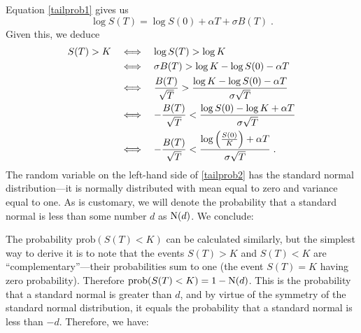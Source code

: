 Equation \eqref{tailprob1} gives us
$$\log S(T) = \log S(0) + \alpha T + \sigma B(T)\; .$$
Given this, we deduce
\begin{align} 
S(T) > K & \quad\Longleftrightarrow\quad \log S(T) > \log K\notag\\
& \quad\Longleftrightarrow\quad \sigma B(T) > \log K - \log S(0)-\alpha T\notag\\
& \quad\Longleftrightarrow\quad \frac{B(T)}{\sqrt{T}} > \frac{\log K - \log S(0)-\alpha T}{\sigma\sqrt{T}}\notag\\
& \quad\Longleftrightarrow\quad -\frac{B(T)}{\sqrt{T}} < \frac{\log S(0)-\log K + \alpha T}{\sigma\sqrt{T}}\notag\\
& \quad\Longleftrightarrow\quad -\frac{B(T)}{\sqrt{T}} < \frac{\log \left(\frac{S(0)}{K}\right) + \alpha T}{\sigma\sqrt{T}}\;.\label{tailprob2}
\end{align}
The random variable on the left-hand side of \eqref{tailprob2} has the standard normal distribution---it is normally distributed with mean equal to zero and variance equal to one.  As is customary, we will denote the probability that a standard normal is less than some number $d$ as $\operatorname{N}(d)$.  We conclude:

The  probability $\text{prob}(S(T)<K)$ can be calculated similarly, but the simplest way to derive it is to note that the events $S(T)>K$ and $S(T)<K$ are ``complementary''---their probabilities sum to one (the event $S(T)=K$ having zero probability).  Therefore $\text{prob}(S(T)<K) = 1-\operatorname{N}(d)$.  This is the probability that a standard normal is greater than $d$, and by virtue of the symmetry of the standard normal distribution, it equals the probability that a standard normal is less than $-d$.  Therefore, we have:



